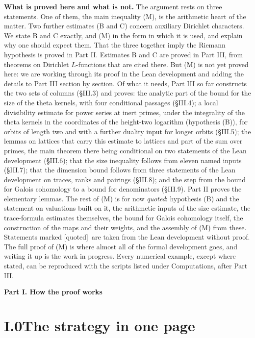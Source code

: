 \documentclass[11pt,letterpaper]{article}
\newcommand{\quoted}{\textsf{[quoted]}}
\begin{document}
\noindent\textbf{What is proved here and what is not.} The argument rests on three statements. One
of them, the main inequality (M), is the arithmetic heart of the matter. Two further estimates (B and C) concern
auxiliary Dirichlet characters. We state B and C exactly, and (M) in the form in which it is used, and explain why one should expect them. That the
three together imply the Riemann hypothesis is proved in Part II. Estimates B and C are proved in Part III,
from theorems on Dirichlet $L$-functions that are cited there. But (M) is not yet proved here: we are working through its proof in the Lean development and adding the details to Part III section by section.
Of what it needs, Part III so far constructs the two sets of columns (\S III.3) and proves: the analytic part of the
bound for the size of the theta kernels, with four conditional passages (\S III.4); a local divisibility estimate for power series at
inert primes, under the integrality of the theta kernels in the coordinates of the height-two logarithm
(hypothesis (B)), for orbits of length two and with a further duality input for longer orbits (\S III.5); the lemmas on
lattices that carry this estimate to lattices and part of the sum over primes, the
main theorem there being conditional on two statements of the Lean development (\S III.6); that the size inequality
follows from eleven named inputs (\S III.7); that the dimension bound follows from three statements of the Lean
development on traces, ranks and pairings (\S III.8); and
the step from the bound for Galois cohomology to a bound for denominators (\S III.9). Part II proves the elementary
lemmas. The rest of (M) is for now
\emph{quoted}: hypothesis (B) and the statement on valuations built on it, the arithmetic inputs of the size estimate,
the trace-formula estimates themselves, the bound for Galois cohomology itself, the construction of the maps and their
weights, and the assembly of (M) from these. Statements marked \quoted\ are taken
from the Lean development without proof. The full proof of (M) is where almost all of the formal
development goes, and writing it up is the work in progress. Every numerical example, except where stated, can be reproduced with the scripts listed
under Computations, after Part III.

\bigskip
\begin{center}\Large\bfseries Part I. How the proof works\end{center}

\section*{I.0\quad The strategy in one page}
\end{document}
